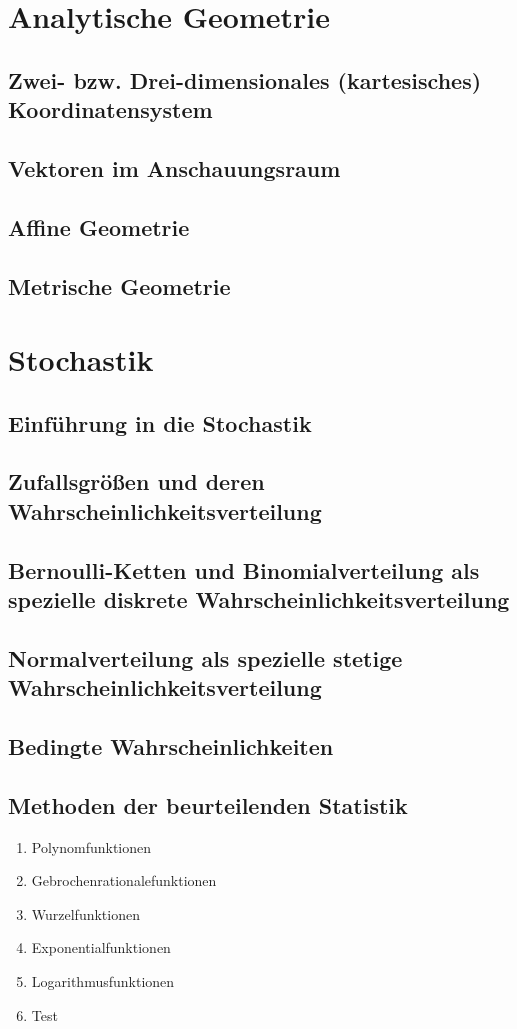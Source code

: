 \documentclass{article}
\begin{document}
\section{Analytische Geometrie}
\subsection{Zwei- bzw. Drei-dimensionales (kartesisches) Koordinatensystem}
\subsection{Vektoren im Anschauungsraum}
\subsection{Affine Geometrie}
\subsection{Metrische Geometrie}

\section{Stochastik}
\subsection{Einführung in die Stochastik}
\subsection{Zufallsgrößen und deren Wahrscheinlichkeitsverteilung}
\subsection{Bernoulli-Ketten und Binomialverteilung als spezielle diskrete Wahrscheinlichkeitsverteilung}
\subsection{Normalverteilung als spezielle stetige Wahrscheinlichkeitsverteilung}
\subsection{Bedingte Wahrscheinlichkeiten}
\subsection{Methoden der beurteilenden Statistik}


\begin{enumerate}
    \item Polynomfunktionen
    \item Gebrochenrationalefunktionen
    \item Wurzelfunktionen
    \item Exponentialfunktionen
    \item Logarithmusfunktionen
    \item Test
\end{enumerate}
\end{document}
